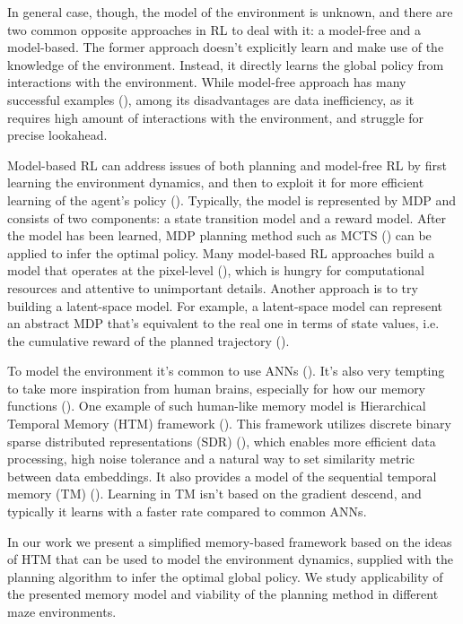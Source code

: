 \documentclass[runningheads]{llncs}
\begin{document}
In general case, though, the model of the environment is unknown, and there are two common opposite approaches in RL to deal with it: a model-free and a model-based. The former approach doesn't explicitly learn and make use of the knowledge of the environment. Instead, it directly learns the global policy from interactions with the environment. While model-free approach has many successful examples (\cite{Mnih_2015_Atari,haarnoja_2018_sac,schulman_2017_ppo}), among its disadvantages are data inefficiency, as it requires high amount of interactions with the environment, and struggle for precise lookahead.

Model-based RL can address issues of both planning and model-free RL by first learning the environment dynamics, and then to exploit it for more efficient learning of the agent's policy (\cite{sutton_barto_2018}). Typically, the model is represented by MDP and consists of two components: a state transition model and a reward model. After the model has been learned, MDP planning method such as MCTS (\cite{Coulom_2007_mcts}) can be applied to infer the optimal policy. Many model-based RL approaches build a model that operates at the pixel-level (\cite{kaiser_2020_modelbased}), which is hungry for computational resources and attentive to unimportant details. Another approach is to try building a latent-space model. For example, a latent-space model can represent an abstract MDP that's equivalent to the real one in terms of state values, i.e. the cumulative reward of the planned trajectory (\cite{silver_2020_muzero}).

To model the environment it's common to use ANNs (\cite{silver_2020_muzero,Ha_Schmidhuber_2018_worldmodels}). It's also very tempting to take more inspiration from human brains, especially for how our memory functions (\cite{Hassabis_2017_neuro}). One example of such human-like memory model is Hierarchical Temporal Memory (HTM) framework (\cite{George_Hawkins_2009}). This framework utilizes discrete binary sparse distributed representations (SDR) (\cite{ahmad_2016_sdr}), which enables more efficient data processing, high noise tolerance and a natural way to set similarity metric between data embeddings. It also provides a model of the sequential temporal memory (TM) (\cite{hawkins_TM}). Learning in TM isn't based on the gradient descend, and typically it learns with a faster rate compared to common ANNs.

In our work we present a simplified memory-based framework based on the ideas of HTM that can be used to model the environment dynamics, supplied with the planning algorithm to infer the optimal global policy. We study applicability of the presented memory model and viability of the planning method in different maze environments.
\end{document}

